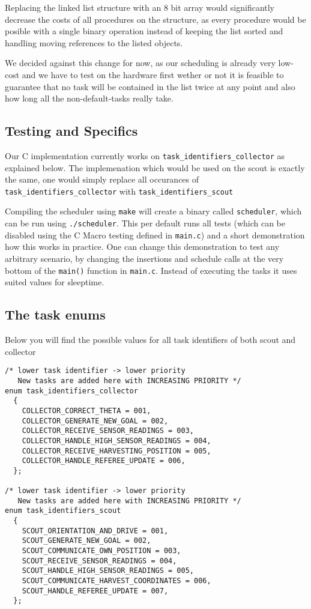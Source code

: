 \documentclass[12pt]{article}
\begin{document}
Replacing the linked list structure with an 8 bit array would significantly decrease the costs of all procedures on the structure, as every procedure would be posible with a single binary operation instead of keeping the list sorted and handling moving references to the listed objects.

We decided against this change for now, as our scheduling is already very low-cost and we have to test on the hardware first wether or not it is feasible to guarantee that no task will be contained in the list twice at any point and also how long all the non-default-tasks really take.


\subsection*{Testing and Specifics}
Our C implementation currently works on \verb!task_identifiers_collector! as explained below. The implemenation which would be used on the scout is exactly the same, one would simply replace all occurances of \verb!task_identifiers_collector! with \verb!task_identifiers_scout!

Compiling the scheduler using \verb!make! will create a binary called \verb!scheduler!, which can be run using \verb!./scheduler!. This per default runs all tests (which can be disabled using the C Macro testing defined in \verb!main.c!) and a short demonstration how this works in practice. One can change this demonstration to test any arbitrary scenario, by changing the insertions and schedule calls at the very bottom of the \verb!main()! function in \verb!main.c!. Instead of executing the tasks it uses suited values for sleeptime.

\newpage
\subsection*{The task enums}

Below you will find the possible values for all task identifiers of both scout and collector

\begin{lstlisting}[]
/* lower task identifier -> lower priority
   New tasks are added here with INCREASING PRIORITY */
enum task_identifiers_collector
  {
    COLLECTOR_CORRECT_THETA = 001,
    COLLECTOR_GENERATE_NEW_GOAL = 002,
    COLLECTOR_RECEIVE_SENSOR_READINGS = 003,
    COLLECTOR_HANDLE_HIGH_SENSOR_READINGS = 004,
    COLLECTOR_RECEIVE_HARVESTING_POSITION = 005,
    COLLECTOR_HANDLE_REFEREE_UPDATE = 006,
  };

/* lower task identifier -> lower priority
   New tasks are added here with INCREASING PRIORITY */
enum task_identifiers_scout
  {
    SCOUT_ORIENTATION_AND_DRIVE = 001,
    SCOUT_GENERATE_NEW_GOAL = 002,
    SCOUT_COMMUNICATE_OWN_POSITION = 003,
    SCOUT_RECEIVE_SENSOR_READINGS = 004,
    SCOUT_HANDLE_HIGH_SENSOR_READINGS = 005,
    SCOUT_COMMUNICATE_HARVEST_COORDINATES = 006,
    SCOUT_HANDLE_REFEREE_UPDATE = 007,
  };
\end{lstlisting}
\end{document}
